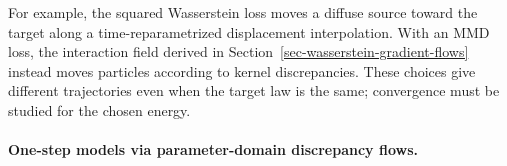 For example, the squared Wasserstein loss moves a diffuse source toward the target along a time-reparametrized displacement interpolation. With an MMD loss, the interaction field derived in Section~\ref{sec-wasserstein-gradient-flows} instead moves particles according to kernel discrepancies. These choices give different trajectories even when the target law is the same; convergence must be studied for the chosen energy.

\paragraph{One-step models via parameter-domain discrepancy flows.}

